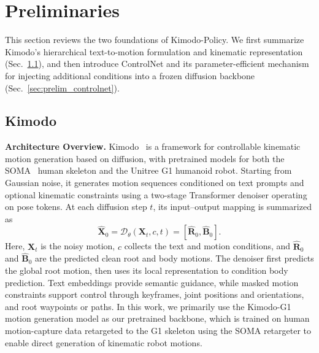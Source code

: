 \section{Preliminaries}
\label{sec:preliminaries}

This section reviews the two foundations of Kimodo-Policy. We first summarize Kimodo's hierarchical text-to-motion formulation and kinematic representation (Sec.~\ref{sec:prelim_kimodo}), and then introduce ControlNet and its parameter-efficient mechanism for injecting additional conditions into a frozen diffusion backbone (Sec.~\ref{sec:prelim_controlnet}).

\subsection{Kimodo}
\label{sec:prelim_kimodo}
\textbf{Architecture Overview.} Kimodo~\citep{kimodo} is a framework for controllable kinematic motion generation based on diffusion, with pretrained models for both the SOMA~\citep{saito2026somaunifyingparametrichuman} human skeleton and the Unitree G1 humanoid robot. Starting from Gaussian noise, it generates motion sequences conditioned on text prompts and optional kinematic constraints using a two-stage Transformer denoiser operating on pose tokens. At each diffusion step $t$, its input--output mapping is summarized as
\begin{equation}
  \widehat{\mathbf{X}}_0 = \mathcal{D}_{\theta}(\mathbf{X}_t,c,t)
  = [\widehat{\mathbf{R}}_0,\widehat{\mathbf{B}}_0].
  \label{eq:kimodo_two_stage}
\end{equation}
Here, $\mathbf{X}_t$ is the noisy motion, $c$ collects the text and motion conditions, and $\widehat{\mathbf{R}}_0$ and $\widehat{\mathbf{B}}_0$ are the predicted clean root and body motions. The denoiser first predicts the global root motion, then uses its local representation to condition body prediction. Text embeddings provide semantic guidance, while masked motion constraints support control through keyframes, joint positions and orientations, and root waypoints or paths. In this work, we primarily use the Kimodo-G1 motion generation model as our pretrained backbone, which is trained on human motion-capture data retargeted to the G1 skeleton using the SOMA retargeter to enable direct generation of kinematic robot motions.

